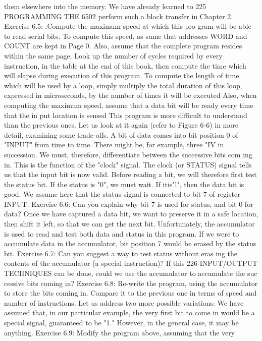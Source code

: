 \documentclass{book}
\begin{document}
them elsewhere into the memory. We have already learned to
225
PROGRAMMING THE 6502
perform such a block transfer in Chapter 2.
Exercise 6.5: .Compute the maximum speed at which this pro
gram will be able to read serial bits. To compute this speed, as
sume that addresses WORD and COUNT are kept in Page 0. Also,
assume that the complete program resides within the same page.
Look up the number of cycles required by every instruction, in the
table at the end of this book, then compute the time which will
elapse during execution of this program. To compute the length
of time which will be used by a loop, simply multiply the total
duration of this loop, expressed in microseconds, by the number
of times it will be executed Also, when computing the maximum
speed, assume that a data bit will be ready every time that the in
put location is sensed
This program is more difficult to understand than the previous
ones. Let us look at it again (refer to Figure 6-6) in more detail,
examining some trade-offs.
A bit of data comes into bit position 0 of "INPUT" from
time to time. There might be, for example, three "IV in succession.
We must, therefore, differentiate between the successive bits com
ing in. This is the function of the "clock" signal.
The clock (or STATUS) signal tells us that the input bit is
now valid.
Before reading a bit, we will therefore first test the status bit.
If the status is "0", we must wait. If itis"l", then the data
bit is good.
We assume here that the status signal is connected to bit 7
of register INPUT.
Exercise 6.6: Can you explain why bit 7 is used for status, and
bit 0 for data?
Once we have captured a data bit, we want to preserve it in
a safe location, then shift it left, so that we can get the next bit.
Unfortunately, the accumulator is used to read and test both data
and status in this program. If we were to accumulate data in the
accumulator, bit position 7 would be erased by the status bit.
Exercise 6.7: Can you suggest a way to test status without eras
ing the contents of the accumulator (a special instruction)? If this
226
INPUT/OUTPUT TECHNIQUES
can be done, could we use the accumulator to accumulate the suc
cessive bits coming in?
Exercise 6.8: Re-write the program, using the accumulator to
store the bits coming in. Compare it to the previous one in terms
of speed and number of instructions.
Let us address two more possible variations:
We have assumed that, in our particular example, the very first bit to
come in would be a special signal, guaranteed to be "1." However, in
the general case, it may be anything.
Exercise 6.9: Modify the program above, assuming that the very
\end{document}
